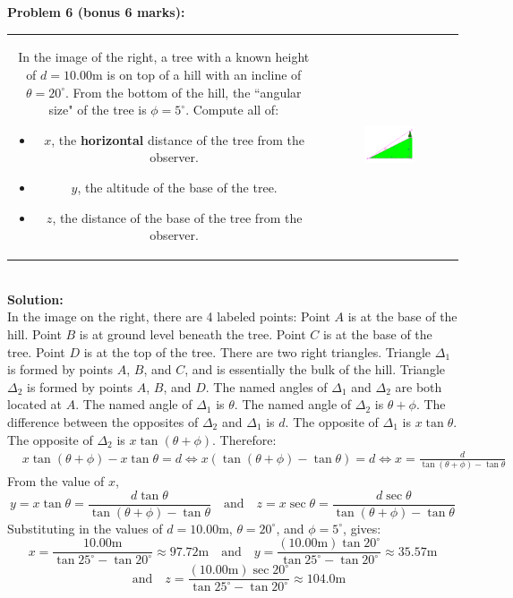 \documentclass{article}
\newcommand{\dr}[1]{\textcolor{dark_red}{#1}}
\begin{document}
\begin{framed}
\textbf{Problem 6 ({\bf bonus} 6 marks):} \\   
\begin{tabular}{cc}
\parbox{0.5\textwidth}{
In the image of the right, a tree with a known height of \(d = 10.00\text{m}\) is on top of a hill with an incline of \(\theta = 20^\circ\). From the bottom of the hill, the ``angular size" of the tree is \(\phi = 5^\circ\). Compute all of:
\begin{itemize}
\item \(x\), the {\bf horizontal} distance of the tree from the observer. 
\item \(y\), the altitude of the base of the tree.
\item \(z\), the distance of the base of the tree from the observer.
\end{itemize}
} & \parbox{0.4\textwidth}{
\includegraphics[width = 0.4\textwidth]{tree_on_a_hill}
}
\end{tabular} \\
\dr{\textbf{Solution:} \\
In the image on the right, there are 4 labeled points: Point \(A\) is at the base of the hill. Point \(B\) is at ground level beneath the tree. Point \(C\) is at the base of the tree. Point \(D\) is at the top of the tree. There are two right triangles. Triangle \(\Delta_1\) is formed by points \(A\), \(B\), and \(C\), and is essentially the bulk of the hill. Triangle \(\Delta_2\) is formed by points \(A\), \(B\), and \(D\). The named angles of \(\Delta_1\) and \(\Delta_2\) are both located at \(A\). The named angle of \(\Delta_1\) is \(\theta\). The named angle of \(\Delta_2\) is \(\theta+\phi\). The difference between the opposites of \(\Delta_2\) and \(\Delta_1\) is \(d\). The opposite of \(\Delta_1\) is \(x\tan\theta\). The opposite of \(\Delta_2\) is \(x\tan(\theta+\phi)\). Therefore:
\begin{align*}
& x\tan(\theta+\phi) - x\tan\theta = d 
\iff x(\tan(\theta+\phi) - \tan\theta) = d 
\iff x = \frac{d}{\tan(\theta+\phi) - \tan\theta}
\end{align*}
From the value of \(x\), 
\[y = x\tan\theta = \frac{d\tan\theta}{\tan(\theta+\phi) - \tan\theta} \quad\text{and}\quad z = x\sec\theta = \frac{d\sec\theta}{\tan(\theta+\phi) - \tan\theta}\]
Substituting in the values of \(d = 10.00\text{m}\), \(\theta = 20^\circ\), and \(\phi = 5^\circ\), gives:
\[x = \frac{10.00\text{m}}{\tan 25^\circ - \tan 20^\circ} \approx 97.72\text{m} \quad\text{and}\quad y = \frac{(10.00\text{m})\tan 20^\circ}{\tan 25^\circ - \tan 20^\circ} \approx 35.57\text{m}\]
\[ \quad\text{and}\quad z = \frac{(10.00\text{m})\sec 20^\circ}{\tan 25^\circ - \tan 20^\circ} \approx 104.0\text{m}\]
}
\end{framed}
\end{document}
